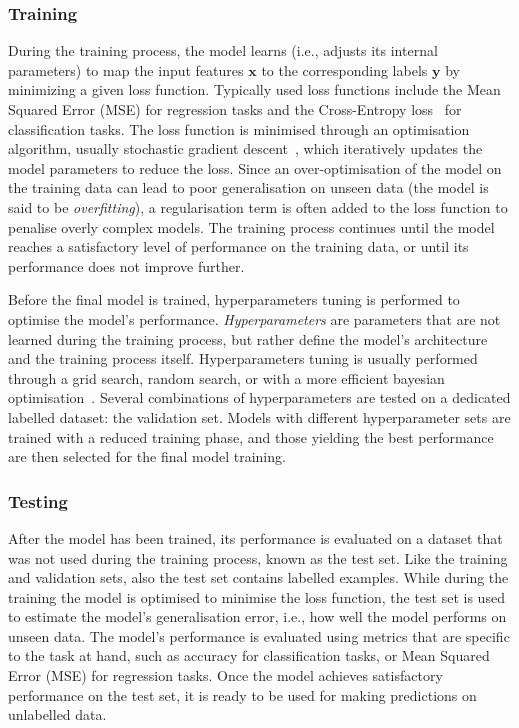 \subsubsection{Training}
During the training process, the model learns (i.e., adjusts its internal parameters) to map the input features $\mathbf{x}$ to the corresponding labels $\mathbf{y}$ by minimizing a given loss function. Typically used loss functions include the Mean Squared Error (MSE) for regression tasks and the Cross-Entropy loss~\cite{mao2023cross} for classification tasks. The loss function is minimised through an optimisation algorithm, usually stochastic gradient descent~\cite{10.1214/aoms/1177729392}, which iteratively updates the model parameters to reduce the loss. Since an over-optimisation of the model on the training data can lead to poor generalisation on unseen data (the model is said to be \emph{overfitting}), a regularisation term is often added to the loss function to penalise overly complex models. The training process continues until the model reaches a satisfactory level of performance on the training data, or until its performance does not improve further. 

Before the final model is trained, hyperparameters tuning is performed to optimise the model's performance. \emph{Hyperparameters} are parameters that are not learned during the training process, but rather define the model's architecture and the training process itself. Hyperparameters tuning is usually performed through a grid search, random search, or with a more efficient bayesian optimisation~\cite{frazier2018tutorial,snoek2012practical,mockus2005bayesian}. Several combinations of hyperparameters are tested on a dedicated labelled dataset: the validation set. Models with different hyperparameter sets are trained with a reduced training phase, and those yielding the best performance are then selected for the final model training.

\subsubsection{Testing}
After the model has been trained, its performance is evaluated on a dataset that was not used during the training process, known as the test set. Like the training and validation sets, also the test set contains labelled examples. While during the training the model is optimised to minimise the loss function, the test set is used to estimate the model's generalisation error, i.e., how well the model performs on unseen data. The model's performance is evaluated using metrics that are specific to the task at hand, such as accuracy for classification tasks, or Mean Squared Error (MSE) for regression tasks. Once the model achieves satisfactory performance on the test set, it is ready to be used for making predictions on unlabelled data.

